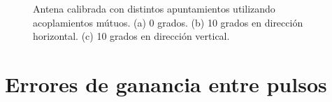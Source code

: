 \begin{figure}[H]
	\centering
 	
		\caption{Antena calibrada con distintos apuntamientos utilizando acoplamientos mútuos. (a) 0 grados. (b) 10 grados en 
		dirección horizontal. (c) 10 grados en dirección vertical.}
	\label{fig:deadTRMsMutual}
\end{figure}


\section{Errores de ganancia entre pulsos}

